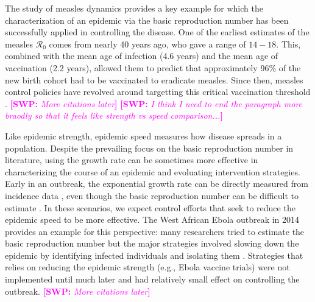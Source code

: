 \documentclass[12pt]{article}\usepackage[]{graphicx}\usepackage[]{color}
\newcommand{\comment}[3]{\textcolor{#1}{\textbf{[#2: }\textit{#3}\textbf{]}}}
\newcommand{\swp}[1]{\comment{magenta}{SWP}{#1}}
\newcommand{\RR}{\ensuremath{{\mathcal R}}}
\begin{document}
The study of measles dynamics provides a key example for which the characterization of an epidemic via the basic reproduction number has been successfully applied in controlling the disease.
One of the earliest estimates of the measles $\RR_0$ comes from \cite{anderson1982directly} nearly 40 years ago, who gave a range of $14 - 18$.
This, combined with the mean age of infection (4.6 years) and the mean age of vaccination (2.2 years), allowed them to predict that approximately 96\% of the new birth cohort had to be vaccinated to eradicate measles.
Since then, measles control policies have revolved around targetting this critical vaccination threshold \citep{venczel2003measles, wolfson2007has, takahashi2015reduced}.
\swp{More citations later}
\swp{I think I need to end the paragraph more braodly so that it feels like strength vs speed comparison...}

Like epidemic strength, epidemic speed measures how disease spreads in a population.
Despite the prevailing focus on the basic reproduction number in literature,
using the growth rate can be sometimes more effective in characterizing the course of an epidemic and evoluating intervention strategies.
Early in an outbreak, the exponential growth rate can be directly measured from incidence data \citep{chowell2003sars, mills2004transmissibility, nishiura2009transmission, nishiura2010pros, ma2014estimating}, even though the basic reproduction number can be difficult to estimate \citep{weitz2015modeling}.
In these scenarios, we expect control efforts that seek to reduce the epidemic speed to be more effective.
The West African Ebola outbreak in 2014 provides an example for this perspective: 
many researchers tried to estimate the basic reproduction number but the major strategies involved slowing down the epidemic by identifying infected individuals and isolating them \citep{pandey2014strategies}.
Strategies that relies on reducing the epidemic strength (e.g., Ebola vaccine trials) were not implemented until much later and had relatively small effect on controlling the outbreak.
\swp{More citations later}
\end{document}
